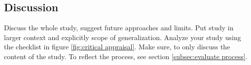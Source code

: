 
\subsection{Discussion}
\label{subsec:discussion}
Discuss the whole study, suggest future approaches and limits. Put study in larger context and explicitly  scope of generalization.
Analyze your study using the checklist in figure \ref{fig:critical appraisal}.
Make sure, to only discuss the content of the study. To reflect the process, see section \ref{subsec:evaluate process}.